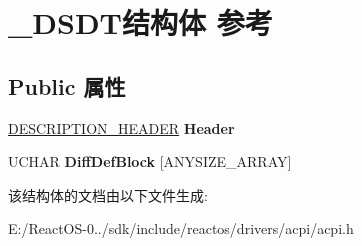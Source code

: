 \hypertarget{struct___d_s_d_t}{}\section{\+\_\+\+D\+S\+D\+T结构体 参考}
\label{struct___d_s_d_t}
\subsection*{Public 属性}
\begin{DoxyCompactItemize}
\item 
\mbox{\label{struct___d_s_d_t_aea22d26bda26bccf96ed5ff04cbf8583}} 
\hyperlink{struct___d_e_s_c_r_i_p_t_i_o_n___h_e_a_d_e_r}{D\+E\+S\+C\+R\+I\+P\+T\+I\+O\+N\+\_\+\+H\+E\+A\+D\+ER} {\bfseries Header}
\item 
\mbox{\label{struct___d_s_d_t_a2b80e0b70ccf3ac49e698a36bae827a6}} 
U\+C\+H\+AR {\bfseries Diff\+Def\+Block} \mbox{[}A\+N\+Y\+S\+I\+Z\+E\+\_\+\+A\+R\+R\+AY\mbox{]}
\end{DoxyCompactItemize}


该结构体的文档由以下文件生成\+:\begin{DoxyCompactItemize}
\item 
E\+:/\+React\+O\+S-\/0../sdk/include/reactos/drivers/acpi/acpi.\+h\end{DoxyCompactItemize}
